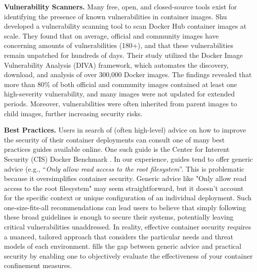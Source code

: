 \noindent\textbf{Vulnerability Scanners.} Many free, open, and closed-source tools exist for identifying the presence of known vulnerabilities in container images. Shu \etal~\cite{shu2017study} developed a vulnerability scanning tool to scan Docker Hub container images at scale. They found that on average, official and community images have concerning amounts of vulnerabilities (180+), and that these vulnerabilities remain unpatched for hundreds of days. Their study utilized the Docker Image Vulnerability Analysis (DIVA) framework, which automates the discovery, download, and analysis of over 300,000 Docker images. The findings revealed that more than 80\% of both official and community images contained at least one high-severity vulnerability, and many images were not updated for extended periods. Moreover, vulnerabilities were often inherited from parent images to child images, further increasing security risks.

\noindent\textbf{Best Practices.} Users in search of (often high-level) advice on how to improve the security of their container deployments can consult one of many best practices guides available online. One such guide is the Center for Interent Security (CIS) Docker Benchmark \cite{CIS}. In our experience, guides tend to offer generic advice (e.g., ``\textit{Only allow read access to the root filesystem}''. This is problematic because it oversimplifies container security. Generic advice like "Only allow read access to the root filesystem" may seem straightforward, but it doesn't account for the specific context or unique configuration of an individual deployment. Such one-size-fits-all recommendations can lead users to believe that simply following these broad guidelines is enough to secure their systems, potentially leaving critical vulnerabilities unaddressed. In reality, effective container security requires a nuanced, tailored approach that considers the particular needs and threat models of each environment. \houdini fills the gap between generic advice and practical security by enabling one to objectively evaluate the effectiveness of your container confinement measures.

